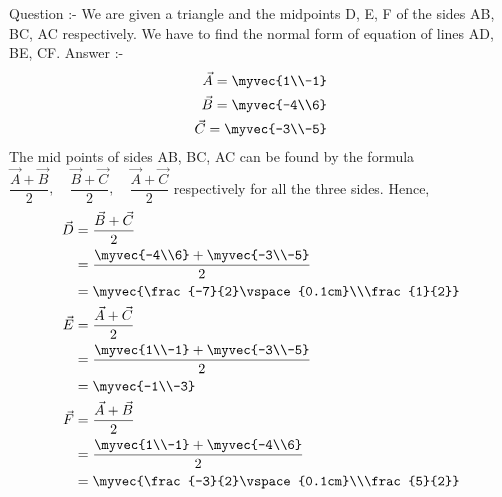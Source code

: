 \documentclass[journal,12pt,twocolumn]{IEEEtran}
\theoremstyle{remark}
\begin{document}
%
Question :-\newline
We are given a triangle and the midpoints D, E, F of the sides AB, BC, AC respectively. We have to find the normal form of equation of lines AD, BE, CF. \newline
Answer :-
\begin{align}
\vec{A} = \myvec{1\\-1}\\
\vspace{0.5in}
\vec{B} = \myvec{-4\\6}\\
\vspace{0.5in}
\vec{C} = \myvec{-3\\-5}
\end{align}
The mid points of sides AB, BC, AC can be found by the formula $\dfrac{\vec{A} + \vec{B}}{2},\quad\dfrac{\vec{B} + \vec{C}}{2},\quad\dfrac{\vec{A} + \vec{C}}{2}$ respectively for all the three sides.
\newline
Hence,
\begin{align}
\vec{D} &= \frac{\vec{B} + \vec{C}}{2}\\ 
&= \frac{\myvec{-4\\6} + \myvec{-3\\-5}}{2}\\
&= \myvec{\frac{-7}{2}\vspace{0.1cm}\\\frac{1}{2}}\\
\vspace{2in}
\vec{E} &= \frac{\vec{A} + \vec{C}}{2}\\
&= \frac{\myvec{1\\-1} + \myvec{-3\\-5}}{2}\\
&= \myvec{-1\\-3}\\
\vspace{2in}
\vec{F} &= \frac{\vec{A} + \vec{B}}{2}\\ 
&= \frac{\myvec{1\\-1} + \myvec{-4\\6}}{2}\\
&= \myvec{\frac{-3}{2}\vspace{0.1cm}\\\frac{5}{2}}
\end{align}
\end{document}
